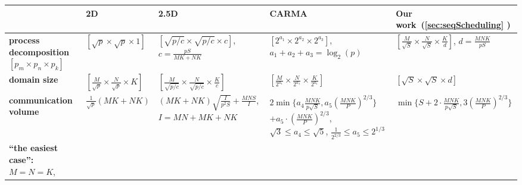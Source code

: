 \documentclass[sigplan,review,anonymous]{acmart}\settopmatter{printfolios=true,printccs=false,printacmref=false}
\begin{document}
\begin{table}
%
\setlength{\tabcolsep}{4pt}
\renewcommand{\arraystretch}{2}
\centering
\scriptsize
\sf
%
\begin{tabular}{lllll}
%
\toprule
%
 & \textbf{2D~\cite{summa}} & \textbf{2.5D~\cite{25d}} & 
 \textbf{CARMA~\cite{CARMA}} & \textbf{Our work~(\cref{sec:seqScheduling} )} \\
%
\midrule
%
\makecell[l]{\textbf{process}\\
\textbf{decomposition} \\
$\left[p_m \times p_n \times p_k\right]$}
&
$\left[\sqrt{p} \times \sqrt{p} \times 1\right]$
&
\makecell[l]{$\left[\sqrt{p/c} \times \sqrt{p/c} \times c\right]$,\\
$c = \frac{pS}{MK + NK}$}
& 
\makecell[l]{$\left[{2^{a_1}} \times {2^{a_2}} \times {2^{a_3}}\right]$,\\
$a_1 + a_2 + a_3 = \log_2(p)$}
& 
\makecell[l]{$\left[\frac{M}{\sqrt{S}} \times \frac{N}{\sqrt{S}} \times 
\frac{K}{d}\right]$,\\
$d = \frac{MNK}{pS}$}
%
\vspace{1.0em}
%
\\
%
%
\textbf{domain size}
&
$\left[\frac{M}{\sqrt{p}} \times \frac{N}{\sqrt{p}} \times K\right]$ 
&
$\left[\frac{M}{\sqrt{p/c}} \times \frac{N}{\sqrt{p/c}} \times 
\frac{K}{c}\right]$
&
$\left[\frac{M}{2^{a_1}} \times \frac{N}{2^{a_1}} \times 
\frac{K}{2^{a_1}}\right]$
& 
$\left[{\sqrt{S}} \times {\sqrt{S}} \times {d}\right]$
%
\vspace{0.5em}
%
\\
%
\midrule
%
\makecell[l]{\textbf{communication}\\
\textbf{volume}}
&
$\frac{1}{\sqrt{p}} \left(MK + NK\right)$
&
\makecell[l]{$(MK + NK)\sqrt{\frac{I}{p^2S}} + \frac{MNS}{I}$, \\
$I = MN + MK + NK$}
&
\makecell[l]{$2\min \Big\{a_4 \frac{MNK}{p\sqrt{S}}, a_5
	\left(\frac{MNK}{P}\right)^{2/3} \Big\} $ \\
	$ + a_5 \cdot \left(\frac{MNK}{P}\right)^{2/3}$, \\
$\sqrt{3}\le a_4 \le \sqrt{5}$,\\
$\frac{1}{2^{2/3}} \le a_5 \le 2^{1/3}$}
& 
$\min \Big\{S + 2 \cdot \frac{MNK}{p\sqrt{S}}, 3 
\left(\frac{MNK}{P}\right)^{2/3} \Big\}$
%
\vspace{0.5em}
%
\\
%
\midrule
%
\makecell[l]{\textbf{``the easiest case'':}\\
$M = N = K$,\\
}
\end{tabular}
\end{table}
\end{document}
